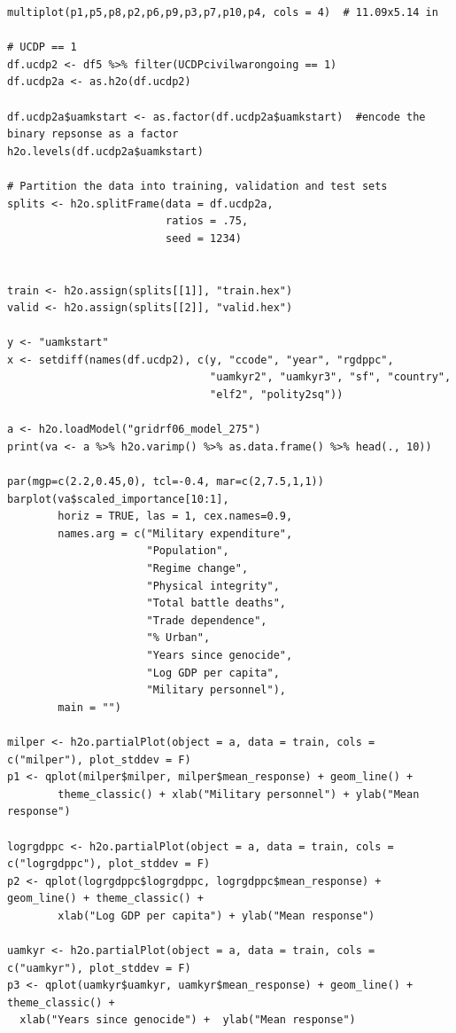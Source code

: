 \documentclass[a4paper,12pt]{article}
\begin{document}
\begin{verbatim}
multiplot(p1,p5,p8,p2,p6,p9,p3,p7,p10,p4, cols = 4)  # 11.09x5.14 in

# UCDP == 1
df.ucdp2 <- df5 %>% filter(UCDPcivilwarongoing == 1)
df.ucdp2a <- as.h2o(df.ucdp2)

df.ucdp2a$uamkstart <- as.factor(df.ucdp2a$uamkstart)  #encode the binary repsonse as a factor
h2o.levels(df.ucdp2a$uamkstart)

# Partition the data into training, validation and test sets
splits <- h2o.splitFrame(data = df.ucdp2a, 
                         ratios = .75,  
                         seed = 1234)  


train <- h2o.assign(splits[[1]], "train.hex")   
valid <- h2o.assign(splits[[2]], "valid.hex") 

y <- "uamkstart"
x <- setdiff(names(df.ucdp2), c(y, "ccode", "year", "rgdppc",
                                "uamkyr2", "uamkyr3", "sf", "country",
                                "elf2", "polity2sq")) 

a <- h2o.loadModel("gridrf06_model_275")
print(va <- a %>% h2o.varimp() %>% as.data.frame() %>% head(., 10)) 

par(mgp=c(2.2,0.45,0), tcl=-0.4, mar=c(2,7.5,1,1))
barplot(va$scaled_importance[10:1],
        horiz = TRUE, las = 1, cex.names=0.9,
        names.arg = c("Military expenditure",
                      "Population",
                      "Regime change",
                      "Physical integrity",
                      "Total battle deaths",
                      "Trade dependence",
                      "% Urban", 
                      "Years since genocide", 
                      "Log GDP per capita",
                      "Military personnel"),
        main = "")

milper <- h2o.partialPlot(object = a, data = train, cols = c("milper"), plot_stddev = F)
p1 <- qplot(milper$milper, milper$mean_response) + geom_line() +
        theme_classic() + xlab("Military personnel") + ylab("Mean response")

logrgdppc <- h2o.partialPlot(object = a, data = train, cols = c("logrgdppc"), plot_stddev = F)
p2 <- qplot(logrgdppc$logrgdppc, logrgdppc$mean_response) + geom_line() + theme_classic() +
        xlab("Log GDP per capita") + ylab("Mean response")

uamkyr <- h2o.partialPlot(object = a, data = train, cols = c("uamkyr"), plot_stddev = F)
p3 <- qplot(uamkyr$uamkyr, uamkyr$mean_response) + geom_line() + theme_classic() + 
  xlab("Years since genocide") +  ylab("Mean response")


\end{verbatim}
\end{document}
